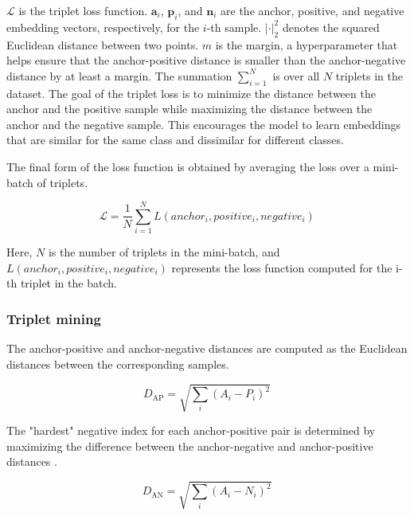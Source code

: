 $\mathcal{L}$ is the triplet loss function.
$\mathbf{a}_i$, $\mathbf{p}_i$, and $\mathbf{n}_i$ are the anchor, positive, and negative embedding vectors, respectively, for the $i$-th sample.
$\left| \cdot \right|_2^2$ denotes the squared Euclidean distance between two points.
$m$ is the margin, a hyperparameter that helps ensure that the anchor-positive distance is smaller than the anchor-negative distance by at least a margin.
The summation $\sum_{i=1}^{N}$ is over all $N$ triplets in the dataset.
The goal of the triplet loss is to minimize the distance between the anchor and the positive sample while maximizing the distance between the anchor and the negative sample. This encourages the model to learn embeddings that are similar for the same class and dissimilar for different classes.

The final form of the loss function is obtained by averaging the loss over a mini-batch of triplets. 

\begin{equation}
\mathcal{L} = \frac{1}{N} \sum_{i=1}^{N} L(anchor_i, positive_i, negative_i)
\end{equation}

Here, $N$ is the number of triplets in the mini-batch, and $L(anchor_i, positive_i, negative_i)$ represents the loss function computed for the i-th triplet in the batch.

\subsubsection{Triplet mining}

The anchor-positive and anchor-negative distances are computed as the Euclidean distances between the corresponding samples.

\begin{equation}
D_{\text{AP}} = \sqrt{\sum_{i} (A_i - P_i)^2}
\end{equation}

The "hardest" negative index for each anchor-positive pair is determined by maximizing the difference between the anchor-negative and anchor-positive distances \cite{XuanImprovedMining}.

\begin{equation}
D_{\text{AN}} = \sqrt{\sum_{i} (A_i - N_i)^2}
\end{equation}

